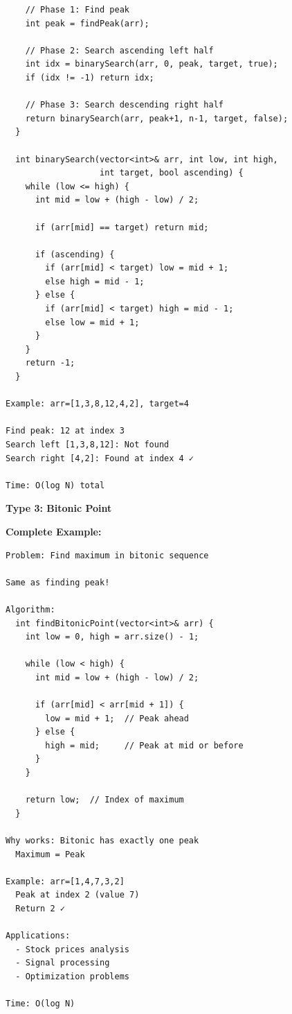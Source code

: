 \documentclass[11pt,a4paper,oneside]{book}
\begin{document}
\begin{tcolorbox}[
    enhanced,breakable,
    colback=lightgray,
    colframe=accentorange,
    boxrule=2pt,
    arc=4mm,
    title=\textbf{Complete Bitonic Array Algorithms}
]
\begin{verbatim}
    // Phase 1: Find peak
    int peak = findPeak(arr);
    
    // Phase 2: Search ascending left half
    int idx = binarySearch(arr, 0, peak, target, true);
    if (idx != -1) return idx;
    
    // Phase 3: Search descending right half
    return binarySearch(arr, peak+1, n-1, target, false);
  }
  
  int binarySearch(vector<int>& arr, int low, int high, 
                   int target, bool ascending) {
    while (low <= high) {
      int mid = low + (high - low) / 2;
      
      if (arr[mid] == target) return mid;
      
      if (ascending) {
        if (arr[mid] < target) low = mid + 1;
        else high = mid - 1;
      } else {
        if (arr[mid] < target) high = mid - 1;
        else low = mid + 1;
      }
    }
    return -1;
  }

Example: arr=[1,3,8,12,4,2], target=4

Find peak: 12 at index 3
Search left [1,3,8,12]: Not found
Search right [4,2]: Found at index 4 ✓

Time: O(log N) total
\end{verbatim}

\textbf{Type 3: Bitonic Point}

\textbf{Complete Example:}
\begin{verbatim}
Problem: Find maximum in bitonic sequence

Same as finding peak!

Algorithm:
  int findBitonicPoint(vector<int>& arr) {
    int low = 0, high = arr.size() - 1;
    
    while (low < high) {
      int mid = low + (high - low) / 2;
      
      if (arr[mid] < arr[mid + 1]) {
        low = mid + 1;  // Peak ahead
      } else {
        high = mid;     // Peak at mid or before
      }
    }
    
    return low;  // Index of maximum
  }

Why works: Bitonic has exactly one peak
  Maximum = Peak

Example: arr=[1,4,7,3,2]
  Peak at index 2 (value 7)
  Return 2 ✓

Applications:
  - Stock prices analysis
  - Signal processing
  - Optimization problems

Time: O(log N)
\end{verbatim}
\end{tcolorbox}
\end{document}
